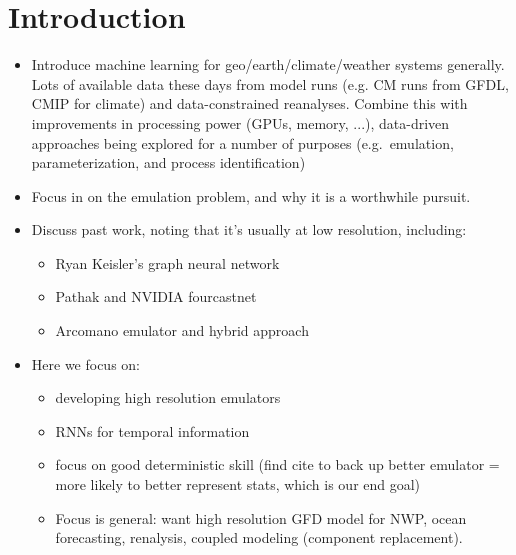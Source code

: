 \section{Introduction}
\label{sec:intro}

\begin{itemize}
    \item Introduce machine learning for geo/earth/climate/weather systems
        generally. Lots of available data these days from model runs (e.g. CM
        runs from GFDL, CMIP for climate) and data-constrained reanalyses.
        Combine this with
        improvements in processing power (GPUs, memory, ...), data-driven
        approaches being explored for a number of purposes (e.g.\ emulation,
        parameterization, and process identification)
    \item Focus in on the emulation problem, and why it is a worthwhile pursuit.
    \item Discuss past work, noting that it's usually at low resolution, including:
        \begin{itemize}
            \item Ryan Keisler's graph neural network
            \item Pathak and NVIDIA fourcastnet
            \item Arcomano emulator and hybrid approach
                \cite{arcomano_machine_2020}
        \end{itemize}
    \item Here we focus on:
        \begin{itemize}
            \item developing high resolution emulators
            \item RNNs for temporal information
            \item focus on good deterministic skill (find cite to
                back up better emulator = more likely to better represent
                stats, which is our end goal)
            \item Focus is general: want high resolution GFD model for NWP,
                ocean forecasting, renalysis, coupled modeling (component replacement).
        \end{itemize}
\end{itemize}
